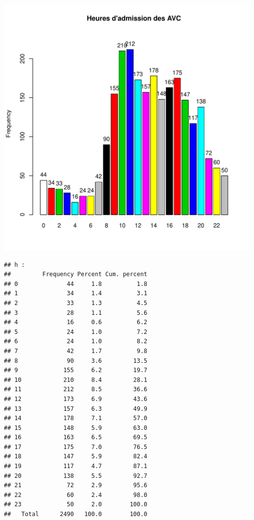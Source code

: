 \documentclass[12pt,english,french,twoside]{report}\usepackage[]{graphicx}\usepackage[]{color}
\makeatletter
\def\maxwidth{ %
  \ifdim\Gin@nat@width>\linewidth
    \linewidth
  \else
    \Gin@nat@width
  \fi
}
\newenvironment{kframe}{%
 \def\at@end@of@kframe{}%
 \ifinner\ifhmode%
  \def\at@end@of@kframe{\end{minipage}}%
  \begin{minipage}{\columnwidth}%
 \fi\fi%
 \def\FrameCommand##1{\hskip\@totalleftmargin \hskip-\fboxsep
 \colorbox{shadecolor}{##1}\hskip-\fboxsep
     \hskip-\linewidth \hskip-\@totalleftmargin \hskip\columnwidth}%
 \MakeFramed {\advance\hsize-\width
   \@totalleftmargin\z@ \linewidth\hsize
   \@setminipage}}%
 {\par\unskip\endMakeFramed%
 \at@end@of@kframe}
\newenvironment{knitrout}{}{} %
\makeatother
\begin{document}
\begin{knitrout}
\includegraphics[width=\maxwidth]{figure/heure_avc2} 
\begin{kframe}\begin{verbatim}
## h :  
##         Frequency Percent Cum. percent
## 0              44     1.8          1.8
## 1              34     1.4          3.1
## 2              33     1.3          4.5
## 3              28     1.1          5.6
## 4              16     0.6          6.2
## 5              24     1.0          7.2
## 6              24     1.0          8.2
## 7              42     1.7          9.8
## 8              90     3.6         13.5
## 9             155     6.2         19.7
## 10            210     8.4         28.1
## 11            212     8.5         36.6
## 12            173     6.9         43.6
## 13            157     6.3         49.9
## 14            178     7.1         57.0
## 15            148     5.9         63.0
## 16            163     6.5         69.5
## 17            175     7.0         76.5
## 18            147     5.9         82.4
## 19            117     4.7         87.1
## 20            138     5.5         92.7
## 21             72     2.9         95.6
## 22             60     2.4         98.0
## 23             50     2.0        100.0
##   Total      2490   100.0        100.0
\end{verbatim}
\end{kframe}
\end{knitrout}
\end{document}
